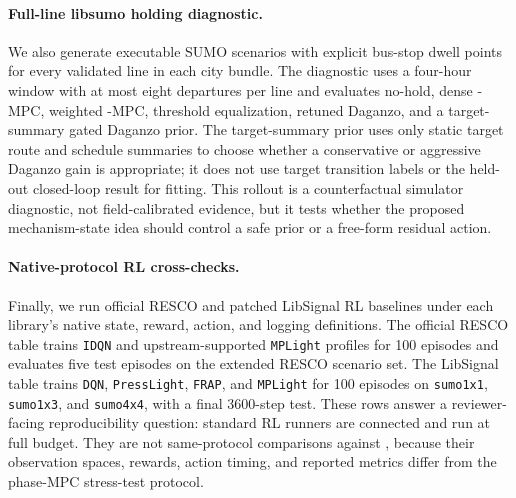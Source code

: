 \paragraph{Full-line libsumo holding diagnostic.}
We also generate executable SUMO scenarios with explicit bus-stop dwell points for every validated line in each city bundle.
The diagnostic uses a four-hour window with at most eight departures per line and evaluates no-hold, dense \Htwo-MPC, weighted \ours-MPC, threshold equalization, retuned Daganzo, and a target-summary gated Daganzo prior.
The target-summary prior uses only static target route and schedule summaries to choose whether a conservative or aggressive Daganzo gain is appropriate; it does not use target transition labels or the held-out closed-loop result for fitting.
This rollout is a counterfactual simulator diagnostic, not field-calibrated evidence, but it tests whether the proposed mechanism-state idea should control a safe prior or a free-form residual action.

\paragraph{Native-protocol RL cross-checks.}
Finally, we run official RESCO and patched LibSignal RL baselines under each library's native state, reward, action, and logging definitions.
The official RESCO table trains \texttt{IDQN} and upstream-supported \texttt{MPLight} profiles for 100 episodes and evaluates five test episodes on the extended RESCO scenario set.
The LibSignal table trains \texttt{DQN}, \texttt{PressLight}, \texttt{FRAP}, and \texttt{MPLight} for 100 episodes on \texttt{sumo1x1}, \texttt{sumo1x3}, and \texttt{sumo4x4}, with a final 3600-step test.
These rows answer a reviewer-facing reproducibility question: standard RL runners are connected and run at full budget.
They are not same-protocol comparisons against \ours, because their observation spaces, rewards, action timing, and reported metrics differ from the phase-MPC stress-test protocol.

\begin{table}[t]
\centering
\small
\resizebox{\textwidth}{!}{}
\caption{Experimental scope and paper role. The primary evidence is strict city-level leave-one-out dynamics; one-step policy and sampled rollout results are secondary control-facing diagnostics.}
\label{tab:scope}
\end{table}

